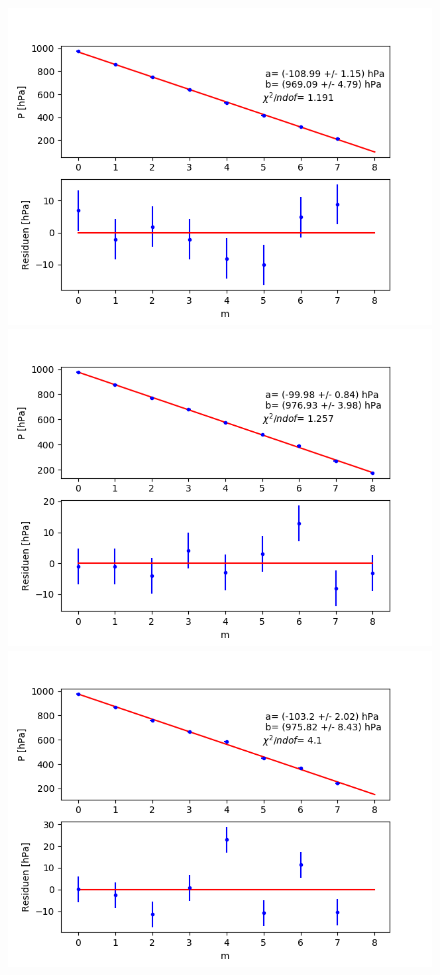 \documentclass[12pt,a4paper]{article}
\begin{document}
\begin{figure}[H]
\includegraphics[scale=0.5]{Bilder/Druck_B_Var2_3.png}
\includegraphics[scale=0.5]{Bilder/Druck_B_Var2_4.png}
\includegraphics[scale=0.5]{Bilder/Druck_B_Var2_5.png}

\end{figure}
\end{document}
